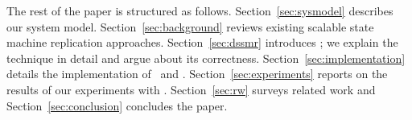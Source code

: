 The rest of the paper is structured as follows.
Section~\ref{sec:sysmodel} describes our system model.
Section~\ref{sec:background} reviews existing scalable state machine replication approaches.
Section~\ref{sec:dssmr} introduces \dssmr{}; we explain the technique in detail and argue about its correctness.
Section~\ref{sec:implementation} details the implementation of \libname\ and \appname{}.
Section~\ref{sec:experiments} reports on the results of our experiments with \dssmr{}.
Section~\ref{sec:rw} surveys related work and
Section~\ref{sec:conclusion} concludes the paper.





